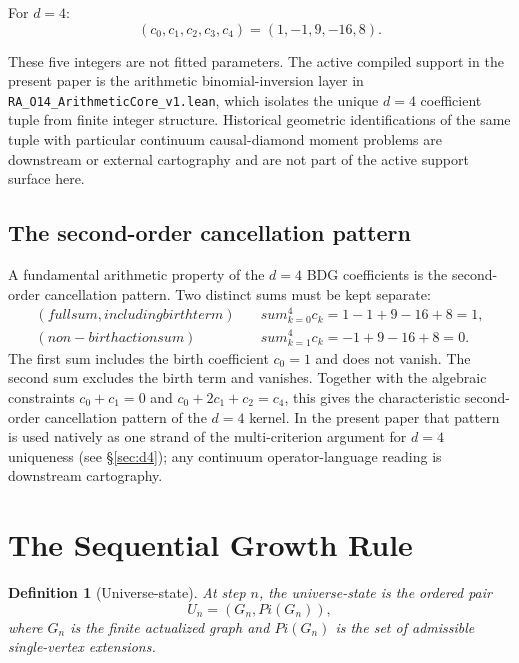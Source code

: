\documentclass[11pt]{article}
\def\Pi{Pi}%
\def\text#1{#1}%
\def\sum{sum}%
\newtheorem{definition}{Definition}
\newcommand{\Pot}{\Pi}
\begin{document}
For $d=4$:
\begin{equation}
\label{eq:bdg_d4}
(c_0,c_1,c_2,c_3,c_4)=(1,-1,9,-16,8).
\end{equation}

These five integers are not fitted parameters. The active compiled support in the present paper is the arithmetic binomial-inversion layer in \texttt{RA\_O14\_ArithmeticCore\_v1.lean}, which isolates the unique $d=4$ coefficient tuple from finite integer structure. Historical geometric identifications of the same tuple with particular continuum causal-diamond moment problems are downstream or external cartography and are not part of the active support surface here.

\subsection{The second-order cancellation pattern}

A fundamental arithmetic property of the $d=4$ BDG coefficients is the second-order cancellation pattern. Two distinct sums must be kept separate:
\begin{align}
\label{eq:full_sum}
\text{(full sum, including birth term)}\quad & \sum_{k=0}^{4} c_k = 1-1+9-16+8 = 1,\\
\label{eq:dalembert_sum}
\text{(non-birth action sum)}\quad & \sum_{k=1}^{4} c_k = -1+9-16+8 = 0.
\end{align}
The first sum includes the birth coefficient $c_0=1$ and does not vanish. The second sum excludes the birth term and vanishes. Together with the algebraic constraints $c_0+c_1=0$ and $c_0+2c_1+c_2=c_4$, this gives the characteristic second-order cancellation pattern of the $d=4$ kernel. In the present paper that pattern is used natively as one strand of the multi-criterion argument for $d=4$ uniqueness (see \S\ref{sec:d4}); any continuum operator-language reading is downstream cartography.

\section{The Sequential Growth Rule}
\label{sec:engine}

\begin{definition}[Universe-state]
At step $n$, the universe-state is the ordered pair
\begin{equation}
U_n=(G_n,\Pot(G_n)),
\end{equation}
where $G_n$ is the finite actualized graph and $\Pot(G_n)$ is the set of admissible single-vertex extensions.
\end{definition}
\end{document}
